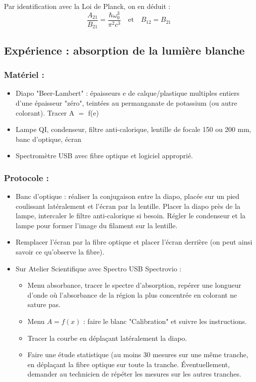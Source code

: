 \documentclass[11pt,a4paper]{report}
\begin{document}
Par identification avec la Loi de Planck, on en déduit :
\begin{equation}
	\boxed{\frac{A_{21}}{B_{21}} = \frac{\hbar\omega_0^3}{\pi^2 c^3}} 
	\quad\text{et}\quad \boxed{B_{12} = B_{21}}
\end{equation}

\newpage
\subsection*{Expérience : absorption de la lumière blanche}

\subsubsection*{Matériel :}
	\begin{itemize}
	\item Diapo "Beer-Lambert" : épaisseurs e de calque/plastique multiples entiers d'une épaisseur 				"zéro", teintées au permanganate de potassium (ou autre colorant). Tracer A $=$ f(e)
	\item Lampe QI, condenseur, filtre anti-calorique, lentille de focale 150 ou 200 mm, banc 						d'optique, écran
	\item Spectromètre USB avec fibre optique et logiciel approprié.
	\end{itemize}

\subsubsection*{Protocole :}
	\begin{itemize}
	\item Banc d'optique : réaliser la conjugaison entre la diapo, placée sur un pied coulissant 				latéralement et l'écran par la lentille. Placer la diapo près de la lampe, intercaler le filtre 		anti-calorique si besoin. Régler le condenseur et la lampe pour former l'image du 						filament sur la lentille.
	\item Remplacer l'écran par la fibre optique et placer l'écran derrière (on peut ainsi savoir ce 			qu'observe la fibre).
	\item Sur Atelier Scientifique avec Spectro USB Spectrovio :
		\begin{itemize}
			\item Menu absorbance, tracer le spectre d'absorption, repérer une longueur d'onde où 								l'absorbance de la région la plus concentrée en colorant ne sature pas.
			\item Menu $A =f(x)$ : faire le blanc "Calibration" et suivre les instructions.
			\item Tracer la courbe en déplaçant latéralement la diapo.
			\item Faire une étude statistique (au moins 30 mesures sur une même tranche, en déplaçant 					la fibre optique sur toute la tranche. Éventuellement, demander au technicien de 						répéter les mesures sur les autres tranches.
		\end{itemize}		 
	\end{itemize} 
\end{document}
